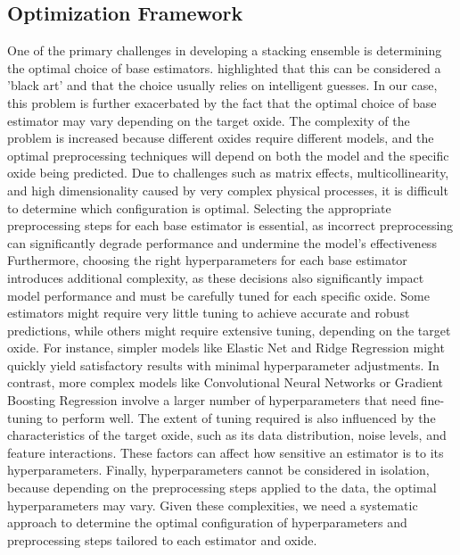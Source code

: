 \subsection{Optimization Framework}\label{sec:optimization_framework}
One of the primary challenges in developing a stacking ensemble is determining the optimal choice of base estimators. \citet{wolpertstacked_1992} highlighted that this can be considered a 'black art' and that the choice usually relies on intelligent guesses. 
In our case, this problem is further exacerbated by the fact that the optimal choice of base estimator may vary depending on the target oxide. 
The complexity of the problem is increased because different oxides require different models, and the optimal preprocessing techniques will depend on both the model and the specific oxide being predicted. 
Due to challenges such as matrix effects, multicollinearity, and high dimensionality caused by very complex physical processes, it is difficult to determine which configuration is optimal.
Selecting the appropriate preprocessing steps for each base estimator is essential, as incorrect preprocessing can significantly degrade performance and undermine the model's effectiveness
Furthermore, choosing the right hyperparameters for each base estimator introduces additional complexity, as these decisions also significantly impact model performance and must be carefully tuned for each specific oxide. 
Some estimators might require very little tuning to achieve accurate and robust predictions, while others might require extensive tuning, depending on the target oxide. 
For instance, simpler models like Elastic Net and Ridge Regression might quickly yield satisfactory results with minimal hyperparameter adjustments. 
In contrast, more complex models like Convolutional Neural Networks or Gradient Boosting Regression involve a larger number of hyperparameters that need fine-tuning to perform well. 
The extent of tuning required is also influenced by the characteristics of the target oxide, such as its data distribution, noise levels, and feature interactions. 
These factors can affect how sensitive an estimator is to its hyperparameters.
Finally, hyperparameters cannot be considered in isolation, because depending on the preprocessing steps applied to the data, the optimal hyperparameters may vary.
Given these complexities, we need a systematic approach to determine the optimal configuration of hyperparameters and preprocessing steps tailored to each estimator and oxide.

